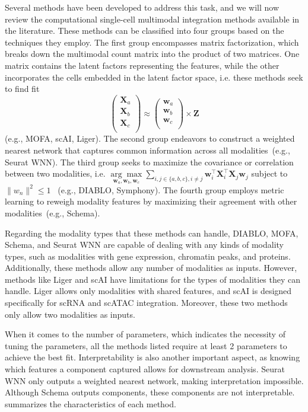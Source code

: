 Several methods have been developed to address this task, and we will now review the computational single-cell multimodal integration methods available in the literature. These methods can be classified into four groups based on the techniques they employ. The first group encompasses matrix factorization, which breaks down the multimodal count matrix into the product of two matrices. One matrix contains the latent factors representing the features, while the other incorporates the cells embedded in the latent factor space, i.e. these methods seek to find fit 
\begin{equation}
\begin{pmatrix}
\mathbf{X}_a\\
\mathbf{X}_b\\
\mathbf{X}_c\\
\end{pmatrix} \approx \begin{pmatrix}
\mathbf{w}_a\\
\mathbf{w}_b\\
\mathbf{w}_c\\
\end{pmatrix} \times \mathbf{Z}
\end{equation}
(e.g., MOFA, scAI, Liger). The second group endeavors to construct a weighted nearest network that captures common information across all modalities~(e.g., Seurat WNN). The third group seeks to maximize the covariance or correlation between two modalities, i.e. $\underset{\mathbf{w}_a, \mathbf{w}_b, \mathbf{w}_c}{\arg\max}\sum_{i,j \in\{a,b,c\}, i\neq j} \mathbf{w}_i^\top \mathbf{X}_i^\top \mathbf{X}_j \mathbf{w}_j$ subject to $\|w_n\|^2 \leq 1$ ~(e.g., DIABLO, Symphony). The fourth group employs metric learning to reweigh modality features by maximizing their agreement with other modalities~(e.g., Schema).


Regarding the modality types that these methods can handle, DIABLO, MOFA, Schema, and Seurat WNN are capable of dealing with any kinds of modality types, such as modalities with gene expression, chromatin peaks, and proteins. Additionally, these methods allow any number of modalities as inputs. However, methods like Liger and scAI have limitations for the types of modalities they can handle. Liger allows only modalities with shared features, and scAI is designed specifically for scRNA and scATAC integration. Moreover, these two methods only allow two modalities as inputs.

When it comes to the number of parameters, which indicates the necessity of tuning the parameters, all the methods listed require at least 2 parameters to achieve the best fit. Interpretability is also another important aspect, as knowing which features a component captured allows for downstream analysis. Seurat WNN only outputs a weighted nearest network, making interpretation impossible. Although Schema outputs components, these components are not interpretable.  summarizes the characteristics of each method.


